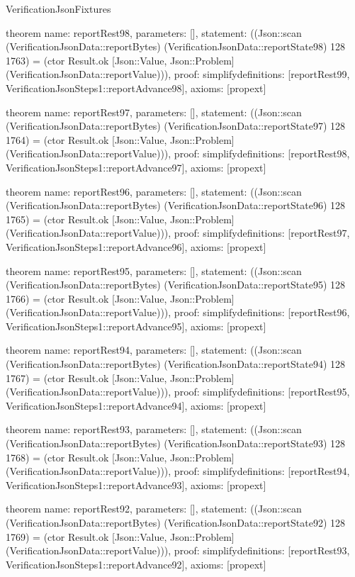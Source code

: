 \begin{lexlean}{VerificationJsonFixtures}
\begin{semanticmodule}
theorem{
  name: reportRest98,
  parameters: [],
  statement: ((Json::scan (VerificationJsonData::reportBytes) (VerificationJsonData::reportState98) 128 1763) = (ctor Result.ok [Json::Value, Json::Problem] (VerificationJsonData::reportValue))),
  proof: simplify{definitions: [reportRest99, VerificationJsonSteps1::reportAdvance98]},
  axioms: [propext]
}

theorem{
  name: reportRest97,
  parameters: [],
  statement: ((Json::scan (VerificationJsonData::reportBytes) (VerificationJsonData::reportState97) 128 1764) = (ctor Result.ok [Json::Value, Json::Problem] (VerificationJsonData::reportValue))),
  proof: simplify{definitions: [reportRest98, VerificationJsonSteps1::reportAdvance97]},
  axioms: [propext]
}

theorem{
  name: reportRest96,
  parameters: [],
  statement: ((Json::scan (VerificationJsonData::reportBytes) (VerificationJsonData::reportState96) 128 1765) = (ctor Result.ok [Json::Value, Json::Problem] (VerificationJsonData::reportValue))),
  proof: simplify{definitions: [reportRest97, VerificationJsonSteps1::reportAdvance96]},
  axioms: [propext]
}

theorem{
  name: reportRest95,
  parameters: [],
  statement: ((Json::scan (VerificationJsonData::reportBytes) (VerificationJsonData::reportState95) 128 1766) = (ctor Result.ok [Json::Value, Json::Problem] (VerificationJsonData::reportValue))),
  proof: simplify{definitions: [reportRest96, VerificationJsonSteps1::reportAdvance95]},
  axioms: [propext]
}

theorem{
  name: reportRest94,
  parameters: [],
  statement: ((Json::scan (VerificationJsonData::reportBytes) (VerificationJsonData::reportState94) 128 1767) = (ctor Result.ok [Json::Value, Json::Problem] (VerificationJsonData::reportValue))),
  proof: simplify{definitions: [reportRest95, VerificationJsonSteps1::reportAdvance94]},
  axioms: [propext]
}

theorem{
  name: reportRest93,
  parameters: [],
  statement: ((Json::scan (VerificationJsonData::reportBytes) (VerificationJsonData::reportState93) 128 1768) = (ctor Result.ok [Json::Value, Json::Problem] (VerificationJsonData::reportValue))),
  proof: simplify{definitions: [reportRest94, VerificationJsonSteps1::reportAdvance93]},
  axioms: [propext]
}

theorem{
  name: reportRest92,
  parameters: [],
  statement: ((Json::scan (VerificationJsonData::reportBytes) (VerificationJsonData::reportState92) 128 1769) = (ctor Result.ok [Json::Value, Json::Problem] (VerificationJsonData::reportValue))),
  proof: simplify{definitions: [reportRest93, VerificationJsonSteps1::reportAdvance92]},
  axioms: [propext]
}


\end{semanticmodule}
\end{lexlean}
